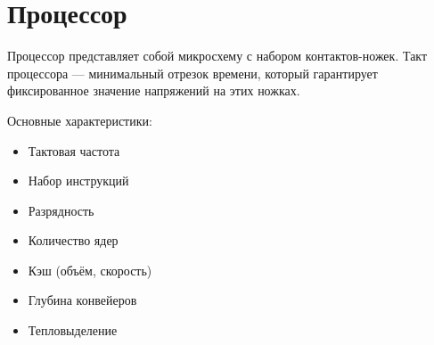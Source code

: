 \documentclass[main]{subfiles}
\begin{document}
\section{Процессор}
Процессор представляет собой микросхему с набором контактов-ножек. Такт процессора ---
минимальный отрезок времени, который гарантирует фиксированное значение напряжений на этих ножках.

Основные характеристики:
\begin{itemize}
\item Тактовая частота
\item Набор инструкций
\item Разрядность
\item Количество ядер
\item Кэш (объём, скорость)
\item Глубина конвейеров
\item Тепловыделение
\end{itemize}
\end{document}
